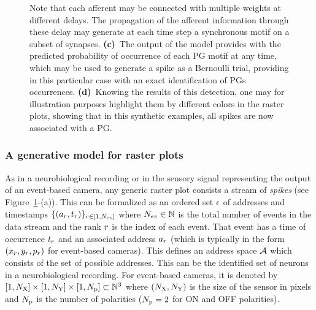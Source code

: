 \documentclass[default]{sn-jnl}%
\theoremstyle{thmstyleone}%
\theoremstyle{thmstyletwo}%
\theoremstyle{thmstylethree}%
\begin{document}
\begin{figure}[t!]
{	    Note that each afferent may be connected with multiple weights at different delays. The propagation of the afferent information through these delay may generate at each time step a synchronous motif on a subset of synapses. %
	    {\bf (c)}~The output of the model provides with the predicted probability of occurrence of each PG motif at any time, which may be used to generate a spike as a Bernoulli trial, providing in this particular case with an exact identification of PGs occurrences.
	    {\bf (d)}~Knowing the results of this detection, one may for illustration purposes highlight them by different colors in the raster plots, showing that in this synthetic examples, all spikes are now associated with a PG. 
	     }
    \label{fig:model}
\end{figure}
% 
\subsubsection{A generative model for raster plots}
%
As in a neurobiological recording or in the sensory signal representing the output of an event-based camera,  any generic raster plot consists a stream of \emph{spikes} (see Figure~\ref{fig:model}-(a)). This can be formalized as an ordered set $\epsilon$ of addresses and timestamps $\{(a_r, t_r)\}_{r \in [1,N_{ev}]}$ where $N_{ev} \in \mathbb{N} $ is the total number of events in the data stream and the rank $r$ is the index of each event. That event has a time of occurrence $t_r$  and an associated address $a_r$ (which is typically in the form $(x_r, y_r, p_r)$ for event-based cameras). This defines an address space $\mathcal{A}$ which consists of the set of possible addresses. This can be the identified set of neurons in a neurobiological recording. For event-based cameras, it is denoted by $[1, N_\text{X}]\times[1, N_\text{Y}] \times [1, N_\text{p}] \subset \mathbb{N}^3$ where $(N_\text{X}, N_\text{Y})$ is the size of the sensor in pixels and $N_\text{p}$ is the number of polarities ($N_\text{p}=2$ for ON and OFF polarities). 
\end{document}
